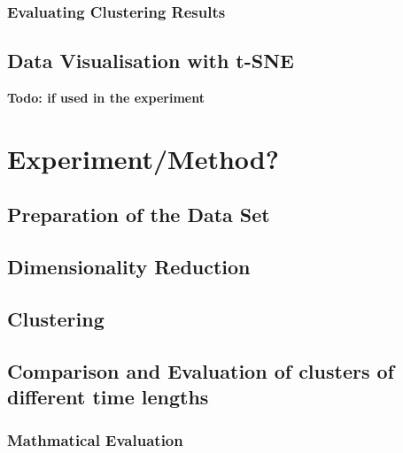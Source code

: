     \subsubsection{Evaluating Clustering Results}
    \label{section:TheoryEvaluatingClusteringResults}
    

  \subsection{Data Visualisation with t-SNE}
  \textbf{Todo: if used in the experiment}



\section{Experiment/Method?}
\label{section:Experiment}


  \subsection{Preparation of the Data Set}
  \label{section:ExperimentPreparationDataSet}
  

  \subsection{Dimensionality Reduction}
  \label{section:DimensionalityReduction}
  

  \subsection{Clustering}
  \label{section:ExperimentClustering}
  

  \subsection{Comparison and Evaluation of clusters of different time lengths}
  \label{section:ExperimentComparisonTimeLengths}
  
  
  \subsubsection{Mathmatical Evaluation}
  
